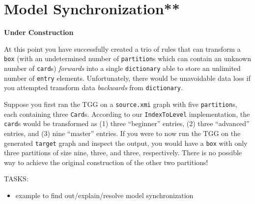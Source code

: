 \newpage
\section{Model Synchronization**}
\genHeader

{\bf Under Construction}

At this point you have successfully created a trio of rules that can transform a \texttt{box} (with an undetermined number of \texttt{partition}s which can
contain an unknown number of \texttt{card}s) \emph{forwards} into a single \texttt{dictionary} able to store an unlimited number of \texttt{entry} elements.
Unfortunately, there would be unavoidable data loss if you attempted transform data \emph{backwards} from \texttt{dictionary}.

Suppose you first ran the TGG on a \texttt{source.xmi} graph with five \texttt{partition}s, each containing three \texttt{Card}s. According to our
\texttt{IndexToLevel} implementation, the \texttt{card}s would be transformed as (1) three ``beginner'' entries, (2) three ``advanced'' entries, and (3)
nine ``master'' entries. If you were to now run the TGG on the generated \texttt{target} graph and inspect the output, you would have a \texttt{box} with
only three partitions of size nine, three, and three, respectively. There is no possible way to achieve the original construction of the other two partitions!

\vspace{1cm}

TASKS:

\begin{itemize}
  \item example to find out/explain/resolve model synchronization
\end{itemize}
